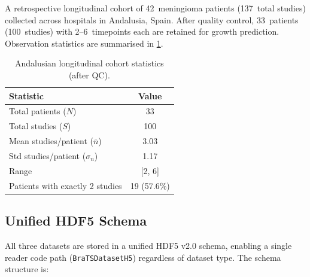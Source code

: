 A retrospective longitudinal cohort of 42~meningioma patients (137~total
studies) collected across hospitals in Andalusia, Spain. After quality control,
33~patients (100~studies) with 2--6~timepoints each are retained for growth
prediction. Observation statistics are summarised in \cref{tab:andalusian_stats}.

\begin{table}[H]
  \centering
  \caption{Andalusian longitudinal cohort statistics (after QC).}
  \label{tab:andalusian_stats}
  \begin{tabular}{lc}
    \toprule
    \textbf{Statistic} & \textbf{Value} \\
    \midrule
    Total patients ($N$) & 33 \\
    Total studies ($S$) & 100 \\
    Mean studies/patient ($\bar{n}$) & 3.03 \\
    Std studies/patient ($\sigma_n$) & 1.17 \\
    Range & [2, 6] \\
    Patients with exactly 2 studies & 19 (57.6\%) \\
    \bottomrule
  \end{tabular}
\end{table}

\subsection{Unified HDF5 Schema}
\label{sec:data:h5}

All three datasets are stored in a unified HDF5 v2.0 schema, enabling a
single reader code path (\texttt{BraTSDatasetH5}) regardless of dataset type.
The schema structure is:

